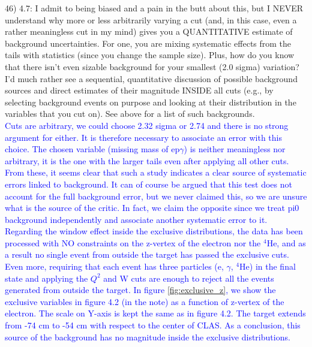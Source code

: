 46) 4.7: I admit to being biased and a pain in the butt about this, but I NEVER 
understand why more or less arbitrarily varying a cut (and, in this case, even 
a rather meaningless cut in my mind) gives you a QUANTITATIVE estimate of 
background uncertainties. For one, you are mixing systematic effects from the 
tails with statistics (since you change the sample size). Plus, how do you know 
that there isn't even sizable background for your smallest (2.0 sigma) 
variation? I'd much rather see a sequential, quantitative discussion of 
possible background sources and direct estimates of their magnitude INSIDE all 
cuts (e.g., by selecting background events on purpose and looking at their 
distribution in the variables that you cut on). See above for a list of such 
backgrounds.\\
 \textcolor{blue}{Cuts are arbitrary, we could choose 2.32 sigma or 2.74 and 
there is no strong argument for either. It is therefore necessary to associate
an error with this choice. The chosen variable (missing mass of ep$\gamma$) is 
neither meaningless nor arbitrary, it is the one with the larger tails even 
after applying all other cuts. From these, it seems clear that such a study 
indicates a clear source of systematic errors linked to background. It can of 
course be argued that this test does not account for the full background error, 
but we never claimed this, so we are unsure what is the source of the critic. In 
fact, we claim the opposite since we treat pi0 background independently and 
associate another systematic error to it.}\\

 \textcolor{blue}{
 Regarding the window effect inside the exclusive distributions, the data
 has been processed with NO constraints on the z-vertex of the electron nor
 the $^{4}$He, and as a result no single event from outside the target has 
 passed the exclusive cuts. Even more, requiring that each event has three 
 particles (e, $\gamma$, $^{4}$He) in the final state and applying the $Q^{2}$ 
 and W cuts are enough to reject all the events generated from outside the 
 target. In figure \ref{fig:exclusive_z}, we show the exclusive variables in 
 figure 4.2 (in the note) as a function of z-vertex of the electron.  The scale 
 on Y-axis is kept the same as in figure 4.2. The target extends from -74 cm to 
 -54 cm with respect to the center of CLAS. As a conclusion, this source of the 
 background has no magnitude inside the exclusive distributions. }\\

